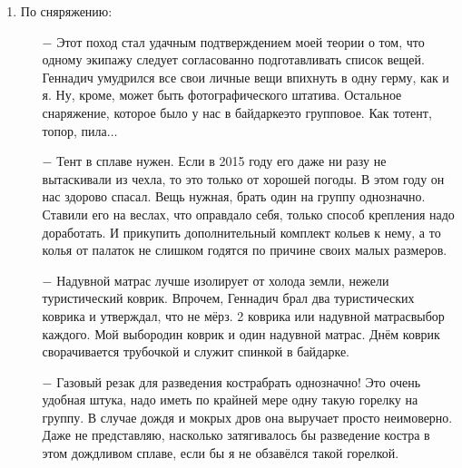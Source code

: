 \begin{enumerate}
\begin{enumerate}
	\item[$-$] 6 человек\mdash предельное количество народа, когда кончается порядок и начинается хаос. У нас был порядок, чему я несказанно рад. Все экипажи показали себя с лучшей стороны, преодолевая все встретившиеся нам трудности.
	\item[$-$] Ребенку одному в походе было скучновато. Лучше, если детей будет несколько. Тогда они организуют «междусобойчик». Сколько радости принесет им поход сознанием того, что взрослые взяли их на такое мероприятие!
	\item[$-$] Опыт чисто мужского похода показывает, что женщин с собой всё\sdash таки надо брать. В их присутствии мужчины стараются не выражаться крепко и вообще ведут себя по\sdash другому. Но и не надо забывать о сказанном Феликсом Квадригиным про женщин в походе. Впрочем, я хочу дополнить его слова о том, что женщины привносят хаос. Это, по моему мнению, касается незамужних дам. Замужние, обычно, пытаются командовать только своими мужьями, а не всеми подряд. Тут уже наше мужское дело давать этому отпор.
	\end{enumerate}	
\item По сняряжению:
	\begin{enumerate}
		\item[$-$] Этот поход стал удачным подтверждением моей теории о том, что одному экипажу следует согласованно подготавливать список вещей. Геннадич умудрился все свои личные вещи впихнуть в одну герму, как и я. Ну, кроме, может быть фотографического штатива. Остальное снаряжение, которое было у нас в байдарке\mdash это групповое. Как то\mdash тент, топор, пила$\ldots$
		\item[$-$] Тент в сплаве нужен. Если в 2015 году его даже ни разу не вытаскивали из чехла, то это только от хорошей погоды. В этом году он нас здорово спасал. Вещь нужная, брать один на группу однозначно. Ставили его на веслах, что оправдало себя, только способ крепления надо доработать. И прикупить дополнительный комплект кольев к нему, а то колья от палаток не слишком годятся по причине своих малых размеров.
		\item[$-$] Надувной матрас лучше изолирует от холода земли, нежели туристический коврик. Впрочем, Геннадич брал два туристических коврика и утверждал, что не мёрз. 2 коврика или надувной матрас\mdash выбор каждого. Мой выбор\mdash один коврик и один надувной матрас. Днём коврик сворачивается трубочкой и служит спинкой в байдарке.
		\item[$-$] Газовый резак для разведения костра\mdash брать однозначно! Это очень удобная штука, надо иметь по крайней мере одну такую горелку на группу. В случае дождя и мокрых дров она выручает просто неимоверно. Даже не представляю, насколько затягивалось бы разведение костра в этом дождливом сплаве, если бы я не обзавёлся такой горелкой.

\end{enumerate}
\end{enumerate}
